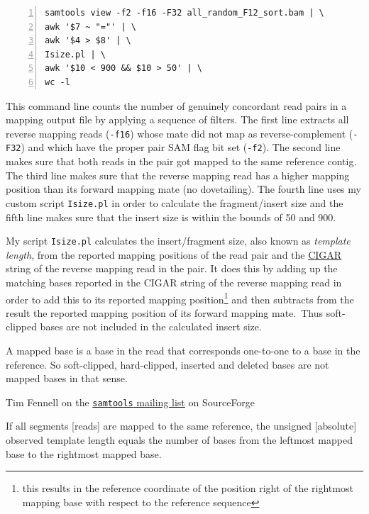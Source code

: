 \documentclass[a4paper,12pt,times,print,index,custombib,custommargin]{PhDThesisPSnPDF}\usepackage[]{graphicx}\usepackage[]{color}
\begin{document}
\begin{cmd}
\captionsetup{type=cmd}
\begin{Verbatim}[fontsize=\scriptsize, formatcom=\color{darkgray}, numbers=left]
samtools view -f2 -f16 -F32 all_random_F12_sort.bam | \
awk '$7 ~ "="' | \
awk '$4 > $8' | \
Isize.pl | \
awk '$10 < 900 && $10 > 50' | \
wc -l 
\end{Verbatim}
\caption{
\small This command line counts the number of genuinely \gls{concordant} read pairs in a mapping output file by applying a sequence of filters. The first line extracts all reverse mapping reads (\texttt{-f16}) whose mate did not map as reverse-complement (\texttt{-F32}) and which have the proper pair SAM flag bit set (\texttt{-f2}). The second line makes sure that both reads in the pair got mapped to the same reference contig. The third line makes sure that the reverse mapping read has a higher mapping position than its forward mapping mate (no dovetailing). The fourth line uses my custom script \texttt{Isize.pl} in order to calculate the fragment/insert size and the fifth line makes sure that the insert size is within the bounds of 50 and 900.
}
\label{cmd:count_genuine_proper_pairs}
\end{cmd}
%
My script \texttt{Isize.pl} calculates the insert/fragment size, also known as \emph{template length}, from the reported mapping positions of the read pair and the \href{http://samtools.github.io/hts-specs/SAMv1.pdf}{CIGAR} string of the reverse mapping read in the pair. It does this by adding up the matching bases reported in the CIGAR string of the reverse mapping read in order to add this to its reported mapping position\footnote{this results in the reference coordinate of the position right of the rightmost mapping base with respect to the reference sequence} and then subtracts from the result the reported mapping position of its forward mapping mate.\todo{include a drawing here, use tikz package}~Thus soft-clipped bases are not included in the calculated insert size.
%
\renewcommand{\epigraphflush}{center}
\setlength{\epigraphwidth}{.9\textwidth}
\setlength{\epigraphrule}{0pt}
%
{\mdseries
\epigraph{
A mapped base is a base in the read that corresponds one-to-one to a base in the reference.  So soft-clipped, hard-clipped, inserted and deleted bases are not mapped bases in that sense.
}
{Tim Fennell on the \href{http://sourceforge.net/p/samtools/mailman/message/28656712/}{\texttt{samtools} mailing list} on SourceForge}
%
\epigraph{
If all segments [reads] are mapped to the same reference, the unsigned [absolute] observed template length equals the number of bases from the leftmost mapped base to the rightmost mapped base.
}
{\cite{SAMformatSpec2011}}
}
\end{document}
